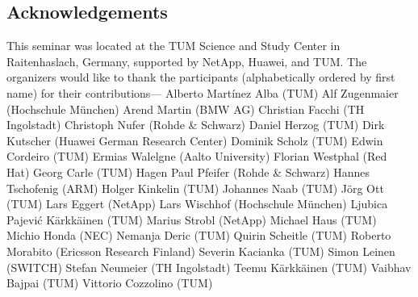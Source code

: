 
\subsection*{Acknowledgements}\label{sec:acknowledgement}


This seminar was located at the TUM Science and Study Center in Raitenhaslach,
Germany, supported by NetApp, Huawei, and TUM\@.  The organizers would like to
thank the participants (alphabetically ordered by first name) for their
contributions---%
Alberto Martínez Alba (TUM)
Alf Zugenmaier (Hochschule München)
Arend Martin (BMW AG)
Christian Facchi (TH Ingolstadt)
Christoph Nufer (Rohde \& Schwarz)
Daniel Herzog (TUM)
Dirk Kutscher (Huawei German Research Center)
Dominik Scholz (TUM)
Edwin Cordeiro (TUM)
Ermias Walelgne (Aalto University)
Florian Westphal (Red Hat)
Georg Carle (TUM)
Hagen Paul Pfeifer (Rohde \& Schwarz)
Hannes Tschofenig (ARM)
Holger Kinkelin (TUM)
Johannes Naab (TUM)
Jörg Ott (TUM)
Lars Eggert (NetApp)
Lars Wischhof (Hochschule München)
Ljubica Pajević Kärkkäinen (TUM)
Marius Strobl (NetApp)
Michael Haus (TUM)
Michio Honda (NEC)
Nemanja Deric (TUM)
Quirin Scheitle (TUM)
Roberto Morabito (Ericsson Research Finland)
Severin Kacianka (TUM)
Simon Leinen (SWITCH)
Stefan Neumeier (TH Ingolstadt)
Teemu Kärkkäinen (TUM)
Vaibhav Bajpai (TUM)
Vittorio Cozzolino (TUM)
